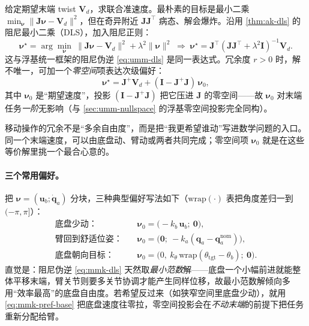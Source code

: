 给定期望末端 twist $\mathbf{V}_d$，求联合准速度。最朴素的目标是最小二乘 $\min_{\boldsymbol{\nu}}\|\mathbf{J}\boldsymbol{\nu}-\mathbf{V}_d\|^2$，但在奇异附近 $\mathbf{J}\mathbf{J}^\top$ 病态、解会爆炸。沿用 \cref{thm:ak-dls} 的阻尼最小二乘（DLS），加入阻尼正则：
\begin{equation}
  \boldsymbol{\nu}^\star=\arg\min_{\boldsymbol{\nu}}\ \|\mathbf{J}\boldsymbol{\nu}-\mathbf{V}_d\|^2+\lambda^2\|\boldsymbol{\nu}\|^2
  \;\Longrightarrow\;
  \boldsymbol{\nu}^\star=\mathbf{J}^\top(\mathbf{J}\mathbf{J}^\top+\lambda^2\mathbf{I})^{-1}\mathbf{V}_d.
  \label{eq:mmk-dls}
\end{equation}
这与浮基统一框架的阻尼伪逆 \cref{eq:umm-dls} 是同一表达式。冗余度 $r>0$ 时，解不唯一，可加一个\emph{零空间}项表达次级偏好：
\begin{equation}
  \boxed{\;\boldsymbol{\nu}^\star=\mathbf{J}^{+}\mathbf{V}_d+(\mathbf{I}-\mathbf{J}^{+}\mathbf{J})\,\boldsymbol{\nu}_0,\;}
  \label{eq:mmk-nullspace}
\end{equation}
其中 $\boldsymbol{\nu}_0$ 是“期望速度”，投影 $(\mathbf{I}-\mathbf{J}^{+}\mathbf{J})$ 把它压进 $\mathbf{J}$ 的零空间——故 $\boldsymbol{\nu}_0$ 对末端任务\emph{一阶}无影响（与 \cref{sec:umm-nullspace} 的浮基零空间投影完全同构）。

\begin{insight}
移动操作的冗余不是“多余自由度”，而是把“我更希望谁动”写进数学问题的入口。同一个末端速度，可以由底盘动、臂动或两者共同完成；零空间项 $\boldsymbol{\nu}_0$ 就是在这些等价解里挑一个最合心意的。
\end{insight}

\paragraph{三个常用偏好。}
把 $\boldsymbol{\nu}=(\mathbf{u}_b;\dot{\mathbf{q}}_a)$ 分块，三种典型偏好写法如下（$\mathrm{wrap}(\cdot)$ 表把角度差归一到 $(-\pi,\pi]$）：
\begin{align}
  \text{底盘少动：}&\quad\boldsymbol{\nu}_0=\big(-k_b\,\mathbf{u}_b;\ \mathbf{0}\big), \label{eq:mmk-pref-base}\\
  \text{臂回到舒适位姿：}&\quad\boldsymbol{\nu}_0=\big(\mathbf{0};\ -k_a(\mathbf{q}_a-\mathbf{q}_a^{\text{nom}})\big), \label{eq:mmk-pref-arm}\\
  \text{底盘朝向目标：}&\quad\boldsymbol{\nu}_0=\big(0,\ k_\theta\,\mathrm{wrap}(\theta_{\text{tgt}}-\theta_b);\ \mathbf{0}\big). \label{eq:mmk-pref-yaw}
\end{align}
直觉是：阻尼伪逆 \cref{eq:mmk-dls} 天然取\emph{最小范数}解——底盘一个小幅前进就能整体平移末端，臂关节则要多关节协调才能产生同样位移，故最小范数解倾向多用“效率最高”的底盘自由度。若希望反过来（如狭窄空间里底盘少动），就用 \cref{eq:mmk-pref-base} 把底盘速度往零拉，零空间投影会在\emph{不动末端}的前提下把任务重新分配给臂。

